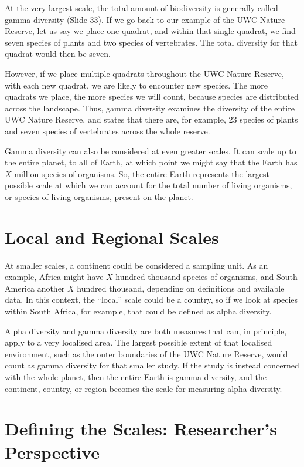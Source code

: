 \documentclass[
  10pt,
]{book}
\begin{document}
At the very largest scale, the total amount of biodiversity is generally
called gamma diversity (Slide 33). If we go back to our example of the
UWC Nature Reserve, let us say we place one quadrat, and within that
single quadrat, we find seven species of plants and two species of
vertebrates. The total diversity for that quadrat would then be seven.

However, if we place multiple quadrats throughout the UWC Nature
Reserve, with each new quadrat, we are likely to encounter new species.
The more quadrats we place, the more species we will count, because
species are distributed across the landscape. Thus, gamma diversity
examines the diversity of the entire UWC Nature Reserve, and states that
there are, for example, 23 species of plants and seven species of
vertebrates across the whole reserve.

Gamma diversity can also be considered at even greater scales. It can
scale up to the entire planet, to all of Earth, at which point we might
say that the Earth has \(X\) million species of organisms. So, the
entire Earth represents the largest possible scale at which we can
account for the total number of living organisms, or species of living
organisms, present on the planet.

\section{Local and Regional Scales}\label{local-and-regional-scales}

At smaller scales, a continent could be considered a sampling unit. As
an example, Africa might have \(X\) hundred thousand species of
organisms, and South America another \(X\) hundred thousand, depending
on definitions and available data. In this context, the ``local'' scale
could be a country, so if we look at species within South Africa, for
example, that could be defined as alpha diversity.

Alpha diversity and gamma diversity are both measures that can, in
principle, apply to a very localised area. The largest possible extent
of that localised environment, such as the outer boundaries of the UWC
Nature Reserve, would count as gamma diversity for that smaller study.
If the study is instead concerned with the whole planet, then the entire
Earth is gamma diversity, and the continent, country, or region becomes
the scale for measuring alpha diversity.

\section{Defining the Scales: Researcher's
Perspective}\label{defining-the-scales-researchers-perspective}
\end{document}
